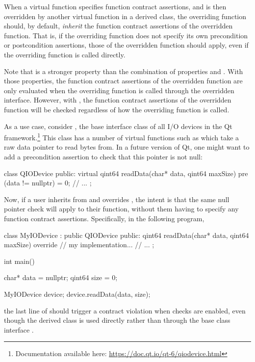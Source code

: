 
When a virtual function specifies function contract assertions, and is then overridden by another virtual function in a derived class, the overriding function should, by default, \emph{inherit} the function contract assertions of the overridden function. That is, if the overriding function does not specify its own precondition or postcondition assertions, those of the overridden function should apply, even if the overriding function is called directly.

Note that  is a stronger property than the combination of properties  and . With those properties, the function contract assertions of the overridden function are only evaluated when the overriding function is called through the overridden interface. However, with , the function contract assertions of the overridden function will be checked regardless of how the overriding function is called.

As a use case, consider , the base interface class of all I/O devices in the Qt framework.\footnote{Documentation available here: \url{https://doc.qt.io/qt-6/qiodevice.html}} This class has a number of virtual functions such as  which take a raw data pointer to read bytes from. In a future version of Qt, one might want to add a precondition assertion to check that this pointer is not null:
\begin{codeblock}
class QIODevice {
public:
  virtual qint64 readData(char* data, qint64 maxSize)
    pre (data != nullptr) = 0;
  // ...
};
\end{codeblock}
Now, if a user inherits from  and overrides , the intent is that the same null pointer check will apply to their function, without them having to specify any function contract assertions. Specifically, in the following program,
\begin{codeblock}
class MyIODevice : public QIODevice {
public:
  qint64 readData(char* data, qint64 maxSize) override {
    // my implementation...
  }
  // ...
};

int main() {
  char* data = nullptr;
  qint64 size = 0;
  
  MyIODevice device;
  device.readData(data, size);
}
\end{codeblock}
the last line of  should trigger a contract violation when checks are enabled, even though the derived class  is used directly rather than through the base class interface . 


